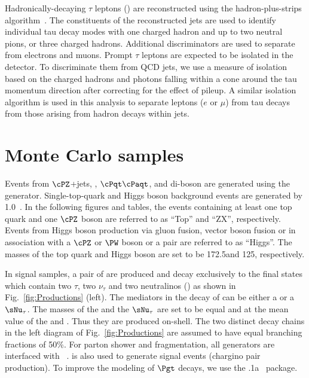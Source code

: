 Hadronically-decaying $\tau$ leptons (\Tau) are reconstructed using the hadron-plus-strips algorithm~\cite{Khachatryan:2015dfa}. The constituents of the reconstructed jets are used to identify individual tau decay modes with one charged hadron and up to two neutral pions, or three charged hadrons. 
Additional discriminators are used to separate \Tau from electrons and muons.
Prompt $\tau$ leptons are expected to be isolated in the detector.
To discriminate them from QCD jets, we use a measure of isolation 
based on the charged hadrons and photons falling within 
a cone around the tau momentum direction after correcting for the effect of
pileup.
 A similar isolation algorithm is 
used in this analysis to separate leptons ($e$ or $\mu$) from tau decays from 
those arising from hadron decays within jets.

\section{Monte Carlo samples}
\label{sect:MCSamples}
Events from $\cPZ$+jets, \wjets, $\cPqt\cPaqt$, and di-boson 
are generated using the ~\cite{Alwall:2011uj} generator. 
Single-top-quark and Higgs boson background events are generated by {\POWHEG} 1.0~\cite{Nason:2004rx,Frixione:2007vw,Alioli:2009je,Alioli:2010xd}.
In the following figures and tables, the events containing at least one top quark and one $\cPZ$ boson are referred to as ``Top'' and ``ZX'', respectively. 
Events from Higgs boson production via gluon fusion, vector boson fusion or in association with a $\cPZ$ or $\PW$ boson or a \ttbar pair are referred to as ``Higgs''. The masses of the top quark and Higgs boson are set to be 172.5\GeV and 125\GeV, respectively.

In signal samples, a pair of \chione 
are produced and decay exclusively to the final states which contain two $\tau$, two $\nu_{\tau}$ and 
two neutralinos (\PSGczDo) as shown in Fig.~\ref{fig:Productions} (left). 
The mediators in the decay of \chione can be either a \sTau or a $\sNu_{\tau}$. 
The masses of the \sTau and the $\sNu_{\tau}$ are set to be equal and at the mean value of the \chione and \PSGczDo. 
Thus they are produced on-shell.
The two distinct decay chains in the left diagram of Fig.~\ref{fig:Productions} 
are assumed to have equal branching fractions of 50\%. 
For parton shower and fragmentation, all generators are interfaced with ~\cite{Sjostrand:2006za}.
\PYTHIA is also used to generate signal events (chargino pair production). To improve the modeling of $\Pgt$ decays, 
we use the .1a~\cite{Davidson:2010rw} package. 


